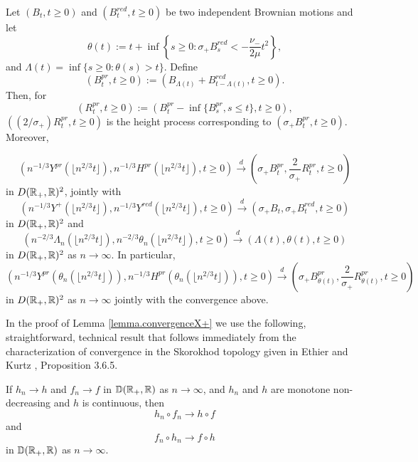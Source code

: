 \begin{lemma}\label{lemma.convergenceX+}
Let $(B_t, t \geq 0)$ and $(B^{red}_t, t\geq 0)$ be two independent Brownian motions and let $$\theta(t):=t+\inf\left\{s\geq 0 : \sigma_+ B^{red}_s< -\frac{\nu_-}{2\mu} t^2\right\},$$ and $\Lambda(t)=\inf\{s\geq 0:\theta(s)> t\}$. Define \begin{equation}\label{eq.definitionBpr}\left(B^{pr}_t,t \geq 0\right):=\left( B_{\Lambda(t)}+ B^{red}_{t-\Lambda(t)}, t\geq 0\right).\end{equation}
Then, for $$(R^{pr}_t, t\geq 0):=\left(B^{pr}_t-\inf\{B^{pr}_s,s\leq t\},t\geq 0\right),$$
$\left((2/\sigma_+)R^{pr}_t, t\geq 0\right)$
is the height process corresponding to $\left(\sigma_+ B^{pr}_t,t \geq 0\right)$.
Moreover,

\begin{equation}\label{eq.convergenceYpr} \left(n^{-1/3}Y^{pr}\left( \lfloor n^{2/3}t \rfloor \right), n^{-1/3}H^{pr}\left( \lfloor n^{2/3}t \rfloor \right),t\geq 0\right)\overset{d}{\to}\left( \sigma_+ B^{pr}_{t} ,\frac{2}{\sigma_+}R^{pr}_t, t\geq 0\right)\end{equation}
in $D({\mathbb R}_+,{\mathbb R})^2$, jointly with 
$$\left(n^{-1/3}Y^+\left(\lfloor n^{2/3}t \rfloor \right), n^{-1/3}Y^{red}\left(\lfloor n^{2/3}t \rfloor \right), t\geq 0\right) \overset{d}{\to}\left(\sigma_+ B_t,\sigma_+ B^{red}_t, t\geq 0\right)$$
in $D({\mathbb R}_+,{\mathbb R})^2$ and 
$$\left(n^{-2/3} \Lambda_n\left(\lfloor n^{2/3}t\rfloor \right), n^{-2/3}\theta_n\left(\lfloor n^{2/3}t\rfloor \right),t\geq 0\right)\overset{d}{\to}\left(\Lambda(t),\theta(t), t\geq 0 \right)$$
in $D({\mathbb R}_+,{\mathbb R})^2$ as $n\to \infty$. 
In particular, 
\begin{equation}\label{eq.convergencecompSprandtheta}\left(n^{-1/3}Y^{pr}\left(\theta_n \left(\lfloor n^{2/3}t\rfloor \right)\right), n^{-1/3}H^{pr}\left(\theta_n\left(\lfloor n^{2/3}t\rfloor \right) \right),t\geq 0 \right) \overset{d}{\to} \left(\sigma_+ B^{pr}_{\theta(t)}, \frac{2}{\sigma_+}R^{pr}_{\theta(t)},t\geq 0\right)\end{equation}
in $D({\mathbb R}_+,{\mathbb R})^2$ as $n\to \infty$ jointly with the convergence above.
\end{lemma}
In the proof of Lemma \ref{lemma.convergenceX+} we use the following, straightforward, technical result that follows immediately from the characterization of convergence in the Skorokhod topology given in Ethier and Kurtz \cite{ethierMarkovProcessesCharacterization1986}, Proposition 3.6.5.

\begin{lemma}\label{lemma.technicalcomposedfunctions}
If $h_n\to h$ and $f_n\to f$ in ${\mathbb D}({\mathbb R}_+,{\mathbb R})$ as $n\to\infty$, and $h_n$ and $h$ are monotone non-decreasing and $h$ is continuous, then 
$$h_n\circ f_n \to h\circ f$$
and 
$$f_n\circ h_n \to f\circ h$$
in ${\mathbb D}({\mathbb R}_+,{\mathbb R})$ as $n\to\infty$.
\end{lemma}



